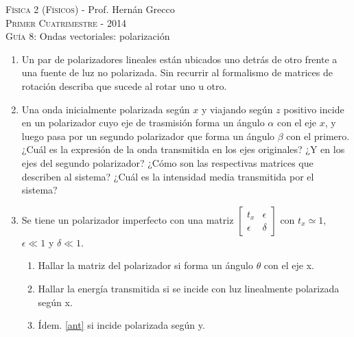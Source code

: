 \documentclass[11pt,spanish,a4paper]{article}
\begin{document}
\begin{center}
	\textsc{\large Física 2 (Físicos)} - Prof. Hernán Grecco\\
	\textsc{\large Primer Cuatrimestre - 2014}\\
	\textsc{\large Guía 8:}	Ondas vectoriales: polarización
\end{center}



\begin{enumerate}

\item Un par de polarizadores lineales están ubicados uno detrás de otro frente a una fuente de luz no polarizada.
	Sin recurrir al formalismo de matrices de rotación describa que sucede al rotar uno u otro.


\item Una onda inicialmente polarizada según \(x\) y viajando según \(z\) positivo incide en un polarizador cuyo eje de trasmisión forma un ángulo \(\alpha\) con el eje \(x\), y luego pasa por un segundo polarizador que forma un ángulo \(\beta\) con el primero.
¿Cuál es la expresión de la onda transmitida en los ejes originales?
¿Y en los ejes del segundo polarizador?
¿Cómo son las respectivas matrices que describen al sistema?
¿Cuál es la intensidad media transmitida por el sistema?


\item Se tiene un polarizador imperfecto con una matriz
\(
	\begin{bmatrix}
		t_x  & \epsilon \\
		\epsilon & \delta
	\end{bmatrix}
\)
con \(t_x \simeq 1\), \(\epsilon \ll 1 \) y \(\delta \ll 1 \).
\begin{enumerate}
	\item Hallar la matriz del polarizador si forma un ángulo \(\theta \) con el eje x.
	\item \label{ant} Hallar la energía transmitida si se incide con luz linealmente polarizada según x.
	\item Ídem. \ref{ant} si incide polarizada según y.
\end{enumerate}



\end{enumerate}
\end{document}
